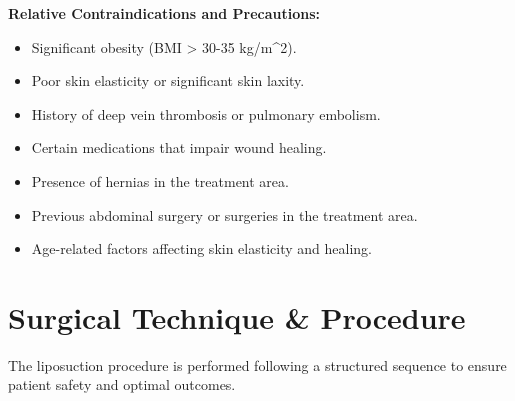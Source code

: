 \textbf{Relative Contraindications and Precautions:}

\begin{itemize}
  \item Significant obesity (BMI > 30-35 kg/m\textasciicircum2).
  \item Poor skin elasticity or significant skin laxity.
  \item History of deep vein thrombosis or pulmonary embolism.
  \item Certain medications that impair wound healing.
  \item Presence of hernias in the treatment area.
  \item Previous abdominal surgery or surgeries in the treatment area.
  \item Age-related factors affecting skin elasticity and healing.
\end{itemize}

\section*{Surgical Technique \& Procedure}
The liposuction procedure is performed following a structured sequence to ensure patient safety and optimal outcomes.

